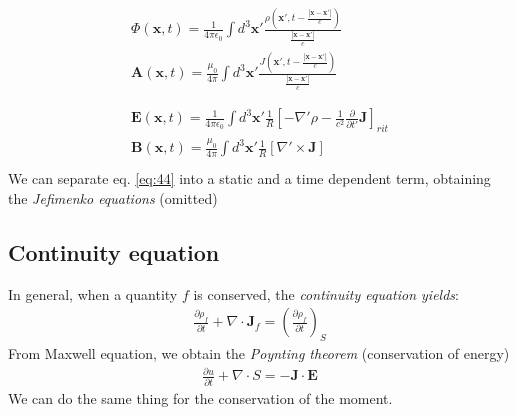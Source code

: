 \documentclass[a4paper, twocolumn]{article}
\begin{document}
\begin{gather}
  \begin{aligned}
    \label{eq:43}
    \Phi(\mathbf{x},t)=\frac{1}{4\pi\epsilon_0}\int d^3\mathbf{x'}\frac{\rho (\mathbf{x'}, t-\frac{\left|\mathbf{x}-\mathbf{x'} \right|}{c})}{\frac{\left|\mathbf{x}-\mathbf{x'} \right|}{c}} \\
    \mathbf{A}(\mathbf{x},t)=\frac{\mu_0}{4\pi}\int d^3\mathbf{x'}\frac{J (\mathbf{x'}, t-\frac{\left|\mathbf{x}-\mathbf{x'} \right|}{c})}{\frac{\left|\mathbf{x}-\mathbf{x'} \right|}{c}} \\
  \end{aligned}\\
  \begin{aligned}
    \label{eq:44}
    \mathbf{E}(\mathbf{x},t)=\frac{1}{4\pi\epsilon_0}\int d^3\mathbf{x'}\frac{1}{R}\left[-\nabla'\rho-\frac{1}{c^2}\frac{\partial}{\partial t'}\mathbf{J}  \right]_{rit} \\
    \mathbf{B}(\mathbf{x},t)=\frac{\mu_0}{4\pi}\int d^3\mathbf{x'}\frac{1}{R}\left[\nabla'\times \mathbf{J} \right] \qquad \qquad \\
  \end{aligned}
\end{gather}
We can separate eq. \ref{eq:44} into a static and a time dependent term, obtaining the \emph{Jefimenko equations} (omitted)

\subsection{Continuity equation}
\label{sec:continuity-equation}
In general, when a quantity $f$ is conserved, the \emph{continuity equation yields}:
\begin{align}
  \label{eq:44}
  \frac{\partial \rho_f}{\partial t}+\nabla\cdot\mathbf{J}_f=\left(\frac{\partial \rho_f}{\partial t}\right)_S
\end{align}
From Maxwell equation, we obtain the \emph{Poynting theorem} (conservation of energy)
\begin{align}
  \label{eq:45}
  \frac{\partial u}{\partial t}+\nabla\cdot S=-\mathbf{J}\cdot\mathbf{E}
\end{align}
We can do the same thing for the conservation of the moment.

\end{document}
